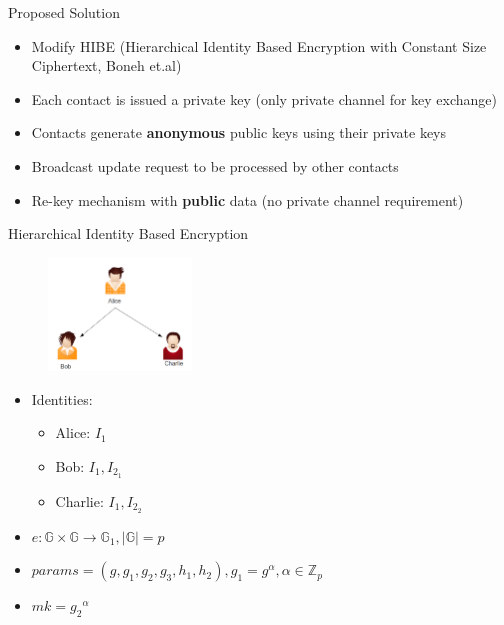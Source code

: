 \documentclass{beamer}
\begin{document}
\begin{frame}{Proposed Solution}
\begin{itemize}
\item Modify HIBE (Hierarchical Identity Based Encryption with
Constant Size Ciphertext, Boneh et.al)
\item Each contact is issued a private key (only private channel for key exchange)
\item Contacts generate \textbf{anonymous} public keys using their private keys
\item Broadcast update request to be processed by other contacts 
\item Re-key mechanism with \textbf{public} data (no private channel requirement)
\end{itemize}
\end{frame}

\begin{frame}{Hierarchical Identity Based Encryption}
\begin{figure}
\includegraphics[height=3cm]{img/img3.png} 
\end{figure}
\pause \begin{itemize}
\item Identities:
 \begin{itemize}
	\item Alice: $I_1$
	\item Bob: $I_1,I_{2_1}$
	\item Charlie: $I_1,I_{2_2}$
\end{itemize}
\pause \item $e : \mathbb{G} \times \mathbb{G} \to \mathbb{G}_1 , |\mathbb{G}| = p$
\pause \item $params = (g, g_1, g_2, g_3, h_1, h_2) ,  g_1 = g^\alpha , \alpha \in \mathbb{Z}_p$
\pause \item $mk = {g_2}^\alpha$
\end{itemize}
\end{frame}
\end{document}

